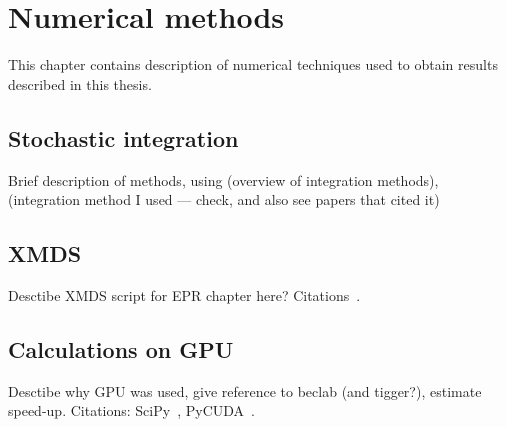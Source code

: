 \chapter{Numerical methods}
\label{cha:appendix:numerical}

This chapter contains description of numerical techniques used to obtain results described in this thesis.

\section{Stochastic integration}

Brief description of methods, using \cite{Werner1997} (overview of integration methods), \cite{Klauder1985} (integration method I used --- check, and also see papers that cited it)


\section{XMDS}

Desctibe XMDS script for EPR chapter here? Citations~\cite{Collecutt2001,Dennis2013}.

\section{Calculations on GPU}

Desctibe why GPU was used, give reference to beclab (and tigger?), estimate speed-up. Citations: SciPy~\cite{Oliphant2007}, PyCUDA~\cite{Klockner2012}.
